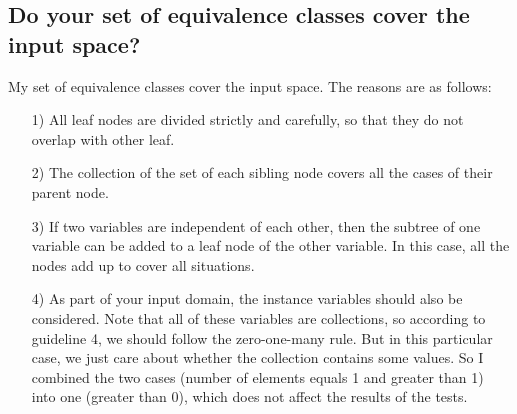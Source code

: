 \documentclass{article}
\begin{document}
\subsection{Do your set of equivalence classes cover the input space?}
My set of equivalence classes cover the input space. The reasons are as follows:
\begin{itemize}
\item [1)] All leaf nodes are divided strictly and carefully, so that they do not overlap with other leaf.
\item [2)] The collection of the set of each sibling node covers all the cases of their parent node.
\item [3)]
If two variables are independent of each other, then the subtree of one variable can be added to a leaf node of the other variable. In this case, all the nodes add up to cover all situations.
\item [4)]
As part of your input domain, the instance variables should also be considered. Note that all of these variables are collections, so according to guideline 4, we should follow the zero-one-many rule. But in this particular case, we just care about whether the collection contains some values. So I combined the two cases (number of elements equals 1 and greater than 1) into one (greater than 0), which does not affect the results of the tests.
\end{itemize}
\enddocument
\end{document}
